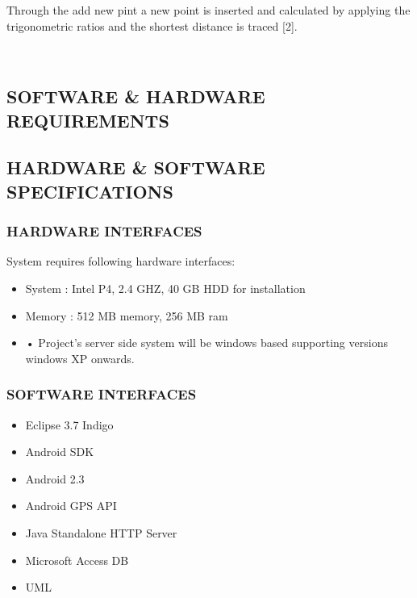 \documentclass[12pt,a4paper]{article}
\begin{document}
	Through the add new pint a new point is inserted and calculated by applying the trigonometric ratios and the shortest distance is traced [2]. 
	
\\

\newpage
\begin{center}
\section{SOFTWARE & HARDWARE REQUIREMENTS}
\end{center}
\pagestyle{plain}
\subsection{HARDWARE & SOFTWARE SPECIFICATIONS}
\subsubsection{HARDWARE INTERFACES}
System requires following hardware interfaces:
\begin{itemize}
\item System		: Intel P4, 2.4 GHZ, 40 GB HDD for installation
\item Memory		: 512 MB memory, 256 MB ram 
\item •	Project’s server side system will be windows based supporting versions windows XP onwards.
\end{itemize}
\subsubsection{SOFTWARE INTERFACES}
\begin{itemize}
\item Eclipse 3.7 Indigo
\item Android SDK
\item Android 2.3
\item Android GPS API
\item Java Standalone HTTP Server
\item Microsoft Access DB
\item UML
\end{itemize}
\end{document}
